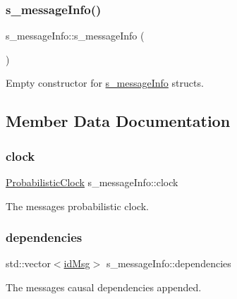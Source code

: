 \subsubsection{\texorpdfstring{s\+\_\+message\+Info()}{s\_messageInfo()}\hspace{0.1cm}{\footnotesize\ttfamily [2/2]}}
{\footnotesize\ttfamily s\+\_\+message\+Info\+::s\+\_\+message\+Info (\begin{DoxyParamCaption}{ }\end{DoxyParamCaption})\hspace{0.3cm}{\ttfamily [inline]}}



Empty constructor for \hyperlink{structs__message_info}{s\+\_\+message\+Info} structs. 



\subsection{Member Data Documentation}
\mbox{\label{structs__message_info_ad35ea02bbca3d54d5b150bb6ea476888}} 
\subsubsection{\texorpdfstring{clock}{clock}}
{\footnotesize\ttfamily \hyperlink{class_probabilistic_clock}{Probabilistic\+Clock} s\+\_\+message\+Info\+::clock}



The message\textquotesingle{}s probabilistic clock. 

\mbox{\label{structs__message_info_a82f52cb53fb0e9b1b985f173f3a013be}} 
\subsubsection{\texorpdfstring{dependencies}{dependencies}}
{\footnotesize\ttfamily std\+::vector$<$\hyperlink{structures_8h_a83a1d9a070efa5341da84cfd8e28d3e5}{id\+Msg}$>$ s\+\_\+message\+Info\+::dependencies}



The message\textquotesingle{}s causal dependencies appended. 

